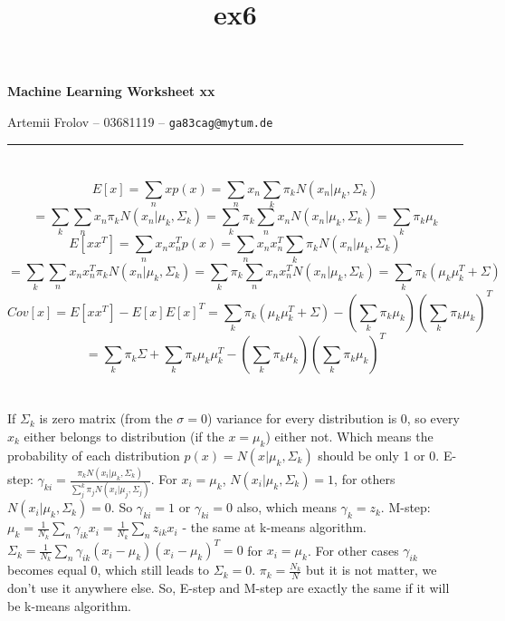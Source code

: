 \documentclass[11pt]{article}
\title{ex6}
\makeatletter
\newcommand{\exercise}{\section{}}
\newcommand{\hwhead}[4]{
\begin{center}
\sffamily\large\bfseries Machine Learning Worksheet #1
\vspace{2mm} 
\normalfont

#2 -- #3 -- \texttt{#4}
\end{center}
\vspace{6mm} \hrule \vspace{4mm}
}
\newcommand{\name}{Artemii Frolov} %
\newcommand{\imat}{03681119} %
\newcommand{\email}{ga83cag@mytum.de} %
\makeatother
\begin{document}
\hwhead{xx}{\name}{\imat}{\email}


\exercise %
$$E[x]=\sum_nxp(x)=\sum_n x_n\sum_k \pi_kN(x_n|\mu_k,\Sigma_k)$$
$$=\sum_k \sum_n x_n\pi_k N(x_n|\mu_k,\Sigma_k)=\sum_k \pi_k\sum_n x_n N(x_n|\mu_k,\Sigma_k)=\sum_k \pi_k \mu_k$$
$$E[xx^T]=\sum_nx_nx_n^Tp(x)=\sum_n x_nx_n^T\sum_k \pi_kN(x_n|\mu_k,\Sigma_k)$$
$$=\sum_k \sum_nx_nx_n^T\pi_k N(x_n|\mu_k,\Sigma_k)=\sum_k \pi_k\sum_n x_nx_n^T N(x_n|\mu_k,\Sigma_k)=\sum_k \pi_k (\mu_k\mu^T_k+\Sigma)$$
$$Cov[x]=E[xx^T]-E[x]E[x]^T=\sum_k \pi_k (\mu_k\mu^T_k+\Sigma)-(\sum_k \pi_k \mu_k)(\sum_k \pi_k \mu_k)^T$$
$$=\sum_k \pi_k \Sigma+\sum_k \pi_k\mu_k\mu^T_k-(\sum_k \pi_k \mu_k)(\sum_k \pi_k \mu_k)^T$$
\exercise
If $\Sigma_k$ is zero matrix (from the $\sigma=0$) variance for every distribution is 0, so  every $x_k$ either belongs to distribution (if the $x=\mu_k$) either not. Which means the probability of each distribution $p(x)=N(x|\mu_k,\Sigma_k)$  should be only 1 or 0. \newline
E-step: $\gamma_{ki}=\frac{\pi_kN(x_i|\mu_k,\Sigma_k)}{\sum_j^k\pi_jN(x_i|\mu_j,\Sigma_j)}$. For $x_i=\mu_k$, $N(x_i|\mu_k,\Sigma_k)=1$, for others $N(x_i|\mu_k,\Sigma_k)=0$. So $\gamma_{ki}=1$ or  $\gamma_{ki}=0$ also, which means $\gamma_{k}=z_k$.\newline
M-step:$\mu_k=\frac{1}{N_k}\sum_n\gamma_{ik}x_i=\frac{1}{N_k}\sum_nz_{ik}x_i$ - the same at k-means algorithm.\newline
$\Sigma_k=\frac{1}{N_k}\sum_n\gamma_{ik}(x_i-\mu_k)(x_i-\mu_k)^T=0$ for $x_i=\mu_k$. For other cases $\gamma_{ik}$ becomes equal 0, which still leads to $\Sigma_k=0$.\newline
$\pi_k=\frac{N_k}{N}$ but it is not matter, we don't use it anywhere else.\newline
So, E-step and M-step are exactly the same if it will be k-means algorithm.
 
  
\end{document}
